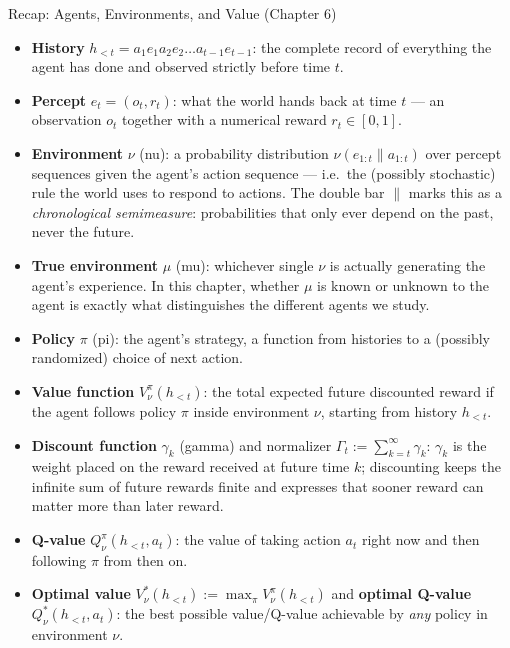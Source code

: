 \documentclass[aspectratio=169,10pt]{beamer}
\begin{document}
\begin{frame}[allowframebreaks]{Recap: Agents, Environments, and Value (Chapter 6)}
  \begin{itemize}
    \item \textbf{History} $h_{<t} = a_1e_1a_2e_2\dots a_{t-1}e_{t-1}$: the
      complete record of everything the agent has done and observed strictly
      before time $t$.
    \item \textbf{Percept} $e_t = (o_t,r_t)$: what the world hands back at
      time $t$ --- an observation $o_t$ together with a numerical reward
      $r_t\in[0,1]$.
    \item \textbf{Environment} $\nu$ (nu): a probability distribution
      $\nu(e_{1:t}\|a_{1:t})$ over percept sequences given the agent's
      action sequence --- i.e.\ the (possibly stochastic) rule the world
      uses to respond to actions. The double bar $\|$ marks this as a
      \emph{chronological semimeasure}: probabilities that only ever depend
      on the past, never the future.
    \item \textbf{True environment} $\mu$ (mu): whichever single $\nu$ is
      actually generating the agent's experience. In this chapter, whether
      $\mu$ is known or unknown to the agent is exactly what distinguishes
      the different agents we study.
    \item \textbf{Policy} $\pi$ (pi): the agent's strategy, a function from
      histories to a (possibly randomized) choice of next action.
    \item \textbf{Value function} $V_\nu^\pi(h_{<t})$: the total expected
      future discounted reward if the agent follows policy $\pi$ inside
      environment $\nu$, starting from history $h_{<t}$.
    \item \textbf{Discount function} $\gamma_k$ (gamma) and normalizer
      $\Gamma_t := \sum_{k=t}^\infty\gamma_k$: $\gamma_k$ is the weight
      placed on the reward received at future time $k$; discounting keeps
      the infinite sum of future rewards finite and expresses that sooner
      reward can matter more than later reward.
    \item \textbf{Q-value} $Q_\nu^\pi(h_{<t},a_t)$: the value of taking
      action $a_t$ right now and then following $\pi$ from then on.
    \item \textbf{Optimal value} $V_\nu^*(h_{<t}) := \max_\pi V_\nu^\pi(h_{<t})$
      and \textbf{optimal Q-value} $Q_\nu^*(h_{<t},a_t)$: the best possible
      value/Q-value achievable by \emph{any} policy in environment $\nu$.
  \end{itemize}


\end{frame}
\end{document}

